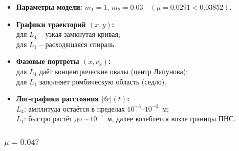 \documentclass[12pt]{article}
\begin{document}
\begin{itemize}
  \item \textbf{Параметры модели:} $m_1=1$, $m_2=0.03\quad(\mu=0.0291<0.03852)$.
  \item \textbf{Графики траекторий $(x,y)$:}\\
        для $L_4$ -- узкая замкнутая кривая;\\
        для $L_1$ -- расходящаяся спираль. 
  \item \textbf{Фазовые портреты $(x,v_x)$:}\\
        для $L_4$ даёт концентрические овалы (центр Ляпунова);\\
        для $L_1$ заполняет ромбическую область (седло).
  \item \textbf{Лог‑графики расстояния $|\delta r|(t)$:}\\
        $L_4$: амплитуда остаётся в пределах $10^{-3}$--$10^{-2}$~м;\\
        $L_1$: быстро растёт до $\sim10^{-1}$~м, далее колеблется возле границы ПНС.
\end{itemize}

\subsubsection{$\mu=0.047$} 
\end{document}
